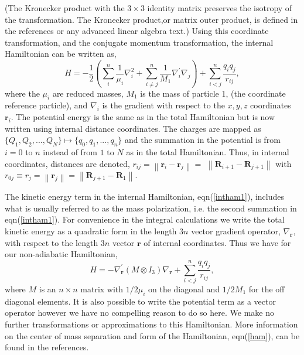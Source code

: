 \documentclass[12pt]{article}
\begin{document}
(The Kronecker product with the $3\times3$ identity matrix preserves the
isotropy of the transformation. The Kronecker product,or matrix outer product,
is defined in the references\cite{Kinghorn95a} or any advanced linear algebra
text.)
Using this coordinate transformation, and the
conjugate momentum transformation, the internal Hamiltonian can be written
as,
\begin{equation}
H=-\frac{1}{2}\left(  \sum_{i}^{n}\frac{1}{\mu_{i}}\nabla_{i}^{2}+\sum_{i\neq
j}^{n}\frac{1}{M_{1}}\nabla_{i}^{\prime}\nabla_{j}\right)  +\sum_{i<j}%
^{n}\frac{q_{i}q_{j}}{r_{ij}},\label{intham1}%
\end{equation}
where the $\mu_{i}$ are reduced masses, $M_{1}$ is the mass of particle 1,
(the coordinate reference particle), and $\nabla_{i}$ is the gradient with
respect to the $x,y,z$ coordinates $\mathbf{r}_{i}$. The potential energy is
the same as in the total Hamiltonian but is now written using internal
distance coordinates. The charges are mapped as $\{Q_{1},Q_{2},...,Q_{N}%
\}\mapsto\{q_{0},q_{1},...,q_{n}\}$ and the summation in the potential is from
$i=0$ to $n$ instead of from $1$ to $N$ as in the total Hamiltonian. Thus, in
internal coordinates, distances are denoted, $r_{ij}=\left\|  \mathbf{r}%
_{i}-\mathbf{r}_{j}\right\|  =$ $\left\|  \mathbf{R}_{i+1}-\mathbf{R}%
_{j+1}\right\|  \,\,$with\thinspace$r_{0j}\equiv r_{j}=\left\|  \mathbf{r}%
_{j}\right\|  =\left\|  \mathbf{R}_{j+1}-\mathbf{R}_{1}\right\|  .$

The kinetic energy term in the internal Hamiltonian, eqn(\ref{intham1}),
includes what is usually referred to as the mass polarization, i.e. the second
summation in eqn(\ref{intham1}). For convenience in the integral calculations
we write the total kinetic energy as a quadratic form in the length $3n$
vector gradient operator, $\nabla_{\mathbf{r}},$ with respect to the length
$3n$ vector $\mathbf{r}$ of internal coordinates. Thus we have for our
non-adiabatic Hamiltonian,
\begin{equation}
H=-\nabla_{\mathbf{r}}^{\prime}\left(  M\otimes I_{3}\right)  \nabla
_{\mathbf{r}}+\sum_{i<j}^{n}\frac{q_{i}q_{j}}{r_{ij}},\label{ham}%
\end{equation}
where $M$ is an $n\times n$ matrix with $1/2\mu_{i}$ on the diagonal and
$1/2M_{1}$ for the off diagonal elements. It is also possible to write the
potential term as a vector operator\cite{Kinghorn95a} however we have no
compelling reason to do so here. We make no further transformations or
approximations to this Hamiltonian. More information on the center of mass
separation and form of the Hamiltonian, eqn(\ref{ham}), can be found in the
references\cite{Kinghorn93,Kinghorn95b}.\qquad\ 
\end{document}
